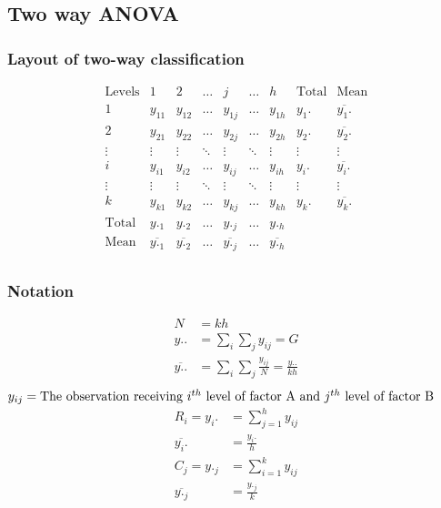 \documentclass[oneside,11pt,pdftex]{book}%
\numberwithin{equation}{section}
\numberwithin{section}{chapter}
\numberwithin{equation}{chapter}
\begin{document}
\subsection{Two way ANOVA}
\subsubsection{Layout of two-way classification}
\[ \begin{matrix}
	\text{Levels} & 1 & 2 & \dots & j & \dots & h & \text{Total} & \text{Mean}\\
	1 & y_{11} & y_{12} & \dots & y_{1j} & \dots & y_{1h} & y_1. & \overline{y_1.}\\
	2 & y_{21} & y_{22} & \dots & y_{2j} & \dots & y_{2h} & y_2. & \overline{y_2.}\\
	\vdots & \vdots & \vdots & \ddots & \vdots & \ddots & \vdots & \vdots & \vdots\\
	i & y_{i1} & y_{i2} & \dots & y_{ij} & \dots & y_{ih} & y_i. & \overline{y_i.}\\
	\vdots & \vdots & \vdots & \ddots & \vdots & \ddots & \vdots & \vdots & \vdots\\
	k & y_{k1} & y_{k2} & \dots & y_{kj} & \dots & y_{kh} & y_k. & \overline{y_k.}\\
	\text{Total} & y._1 & y._2 & \dots & y._j & \dots & y._h &  & \\
	\text{Mean} & \overline{y._1} & \overline{y._2} & \dots & \overline{y._j} & \dots & \overline{y._h} &  & \\
\end{matrix} \]

\subsubsection{Notation}
\begin{align*}
	N&=kh\\
	y..&=\sum_i \sum_j y_{ij}=G\\
	\overline{y..}&=\sum_i \sum_j \frac{y_{ij}}{N}=\frac{y..}{kh}\\
\end{align*}
$y_{ij}=\text{The observation receiving $ i^{th} $ level of factor A and $ j^{th} $ level of factor B}$
\begin{align*}
	R_i=y_i.&=\sum_{j=1}^{h}y_{ij}\\
	\overline{y_i.}&=\frac{y_i.}{h}\\
	C_j=y._j&=\sum_{i=1}^k y_{ij}\\
	\overline{y._j}&=\frac{y._j}{k}
\end{align*}
\end{document}
